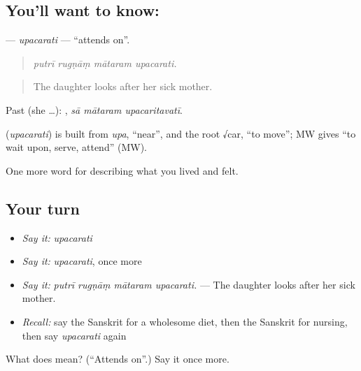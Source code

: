 \subsection*{You'll want to know: }
\textbf{} — \emph{upacarati} — \textquotedblleft{}attends on\textquotedblright{}.

\begin{quote}
   
\end{quote}

\begin{quote}
\emph{putrī rugṇāṃ mātaram upacarati.}
\end{quote}

\begin{quote}
The daughter looks after her sick mother.
\end{quote}

Past (she …):   , \emph{sā mātaram upacaritavatī}.

\begin{cousinweb}
\textbf{} (\emph{upacarati}) is built from \emph{upa}, \textquotedblleft{}near\textquotedblright{}, and the root √car, \textquotedblleft{}to move\textquotedblright{}; MW gives \textquotedblleft{}to wait upon, serve, attend\textquotedblright{} (MW).
\end{cousinweb}

\begin{grammarlens}[title={What you've built}]
One more word for describing what you lived and felt.
\end{grammarlens}

\subsection*{Your turn}
\begin{itemize}
\raggedright
  \item \emph{Say it:} \emph{upacarati}
  \item \emph{Say it:} \emph{upacarati}, once more
  \item \emph{Say it:} \emph{putrī rugṇāṃ mātaram upacarati.} — The daughter looks after her sick mother.
  \item \emph{Recall:} say the Sanskrit for a wholesome diet, then the Sanskrit for nursing, then say \emph{upacarati} again
\end{itemize}

\begin{tcolorbox}[breakable,colback=teal!4,colframe=teal!35!black,title={Before you move on}]
What does  mean? (\textquotedblleft{}Attends on\textquotedblright{}.) Say it once more.
\end{tcolorbox}
